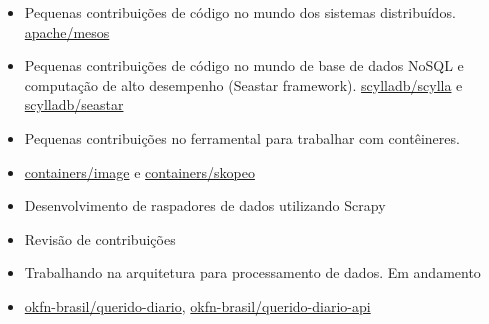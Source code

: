 \documentclass[10pt,a4paper]{altacv}
\begin{document}
\divider


\begin{itemize}
\item Pequenas contribuições de código no mundo dos sistemas distribuídos. \href{https://github.com/apache/mesos/commits/master?author=jvanz}{apache/mesos}
\end{itemize}
\begin{itemize}
\item Pequenas contribuições de código no mundo de base de dados NoSQL e computação de alto desempenho (Seastar framework). \href{https://github.com/scylladb/scylla/commits/master?author=jvanz}{scylladb/scylla} e \href{https://github.com/scylladb/seastar/commits/master?author=jvanz}{scylladb/seastar}
\end{itemize}
\begin{itemize}
\item Pequenas contribuições no ferramental para trabalhar com contêineres.
\item \href{https://github.com/containers/image/commits?author=jvanz}{containers/image} e \href{https://github.com/containers/skopeo/commits?author=jvanz}{containers/skopeo}
\end{itemize}
\begin{itemize}
\item Desenvolvimento de raspadores de dados utilizando Scrapy
\item Revisão de contribuições
\item Trabalhando na arquitetura para processamento de dados. Em andamento
\item \href{https://github.com/okfn-brasil/querido-diario}{okfn-brasil/querido-diario}, \href{https://github.com/okfn-brasil/querido-diario-api}{okfn-brasil/querido-diario-api}
\end{itemize}

\clearpage
\end{document}
